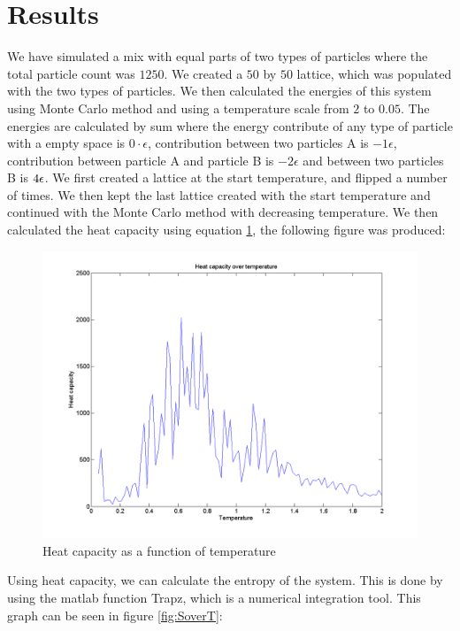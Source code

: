 \documentclass[12pt,a4paper]{report}
\begin{document}
\section{Results}
We have simulated a mix with equal parts of two types of particles where the total particle count was $1250$. We created a $50$ by $50$ lattice, which was populated with the two types of particles. We then calculated the energies of this system using Monte Carlo method and using a temperature scale from $2$ to $0.05$. The energies are calculated by sum where the energy contribute of any type of particle with a empty space is $0 \cdot\epsilon$, contribution between two particles A is $-1 \epsilon$, contribution between particle A and particle B is $-2\epsilon$ and between two particles B is $\-4 \epsilon$. We first created a lattice at the start temperature, and flipped a number of times. We then kept the last lattice created with the start temperature and continued with the Monte Carlo method with decreasing temperature. We then calculated the heat capacity using equation \ref{fig:HoverT}, the following figure \label{fig:HoverT} was produced:

\begin{figure}[h]
\centering
\includegraphics[width=\textwidth]{HoverT.png}
\caption{Heat capacity as a function of temperature}
\label{fig:HoverT}
\end{figure}
Using heat capacity, we can calculate the entropy of the system. This is done by using the matlab function Trapz, which is a numerical integration tool. This graph can be seen in figure \ref{fig:SoverT}:
\end{document}
